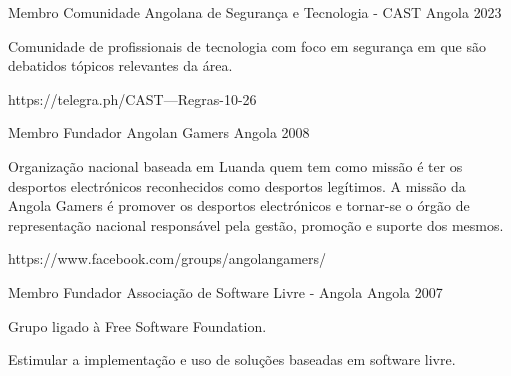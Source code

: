 


\begin{cventries}

    \cventry
    {Membro} %
    {Comunidade Angolana de Segurança e Tecnologia - CAST} %
    {Angola} %
    {2023} %
    { %
    \begin{cvitems}
    \item {Comunidade de profissionais de tecnologia com foco em segurança em que são debatidos tópicos relevantes da área.}
    \item https://telegra.ph/CAST---Regras-10-26
    \end{cvitems}
    }


\cventry
{Membro Fundador} %
{Angolan Gamers} %
{Angola} %
{2008} %
{ %
\begin{cvitems}
\item {Organização nacional baseada em Luanda quem tem como missão é ter os desportos electrónicos reconhecidos como desportos legítimos. A missão da Angola Gamers é promover os desportos electrónicos e tornar-se o órgão de representação nacional responsável pela gestão, promoção e suporte dos mesmos.}
\item {https://www.facebook.com/groups/angolangamers/}
\end{cvitems}
}


\cventry
{Membro Fundador} %
{Associação de Software Livre - Angola} %
{Angola} %
{2007} %
{ %
\begin{cvitems}
\item {Grupo ligado à Free Software Foundation.}
\item {Estimular a implementação e uso de soluções baseadas em software livre.}
\end{cvitems}
}


\end{cventries}
